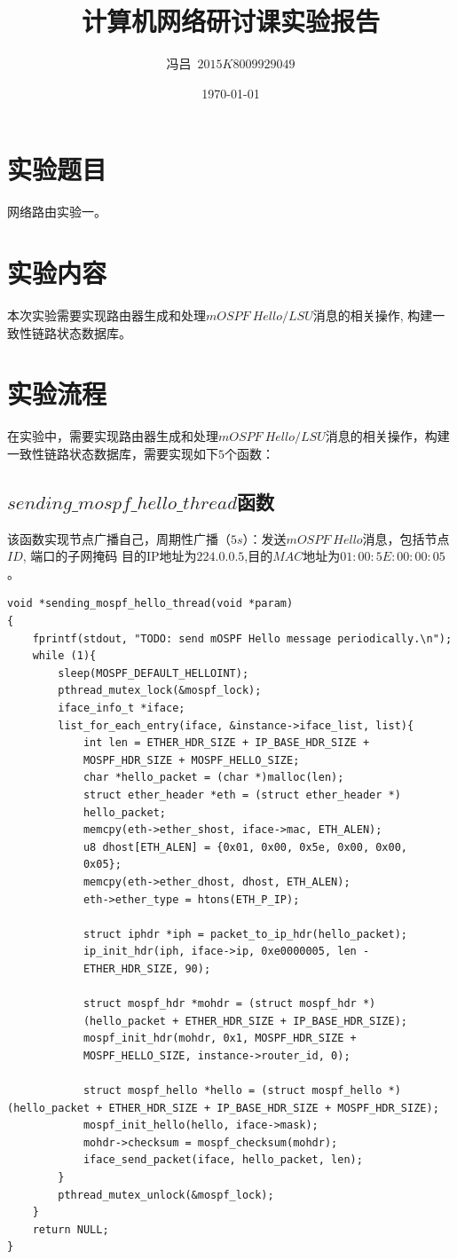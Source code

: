 \documentclass[UTF8,noindent]{ctexart}
\title{\CJKfamily{zhkai}计算机网络研讨课实验报告}
\author{{\CJKfamily{zhkai}冯吕}\ $2015K8009929049$}
\date{\today}
\begin{document}
\maketitle
{}
\section*{{实验题目}}网络路由实验一。
\section*{{实验内容}}
本次实验需要实现路由器生成和处理$mOSPF\ Hello/LSU$消息的相关操作,
构建一致性链路状态数据库。
\section*{{实验流程}}
在实验中，需要实现路由器生成和处理$mOSPF\ Hello/LSU$消息的相关操作，构建一致性链路状态数据库，需要实现如下$5$个函数：
\subsection{$sending\_mospf\_hello\_thread$函数}
该函数实现节点广播自己，周期性广播（$5s$）：发送$mOSPF\ Hello$消息，包括节点$ID$, 端口的子网掩码
目的IP地址为$224.0.0.5$,目的$MAC$地址为$01:00:5E:00:00:05$。
\begin{lstlisting}
void *sending_mospf_hello_thread(void *param)
{
	fprintf(stdout, "TODO: send mOSPF Hello message periodically.\n");
	while (1){
		sleep(MOSPF_DEFAULT_HELLOINT);
		pthread_mutex_lock(&mospf_lock);
		iface_info_t *iface;
		list_for_each_entry(iface, &instance->iface_list, list){
			int len = ETHER_HDR_SIZE + IP_BASE_HDR_SIZE +
			MOSPF_HDR_SIZE + MOSPF_HELLO_SIZE;
			char *hello_packet = (char *)malloc(len);
			struct ether_header *eth = (struct ether_header *)
			hello_packet;
			memcpy(eth->ether_shost, iface->mac, ETH_ALEN);
			u8 dhost[ETH_ALEN] = {0x01, 0x00, 0x5e, 0x00, 0x00, 
			0x05};
			memcpy(eth->ether_dhost, dhost, ETH_ALEN);
			eth->ether_type = htons(ETH_P_IP);

			struct iphdr *iph = packet_to_ip_hdr(hello_packet);
			ip_init_hdr(iph, iface->ip, 0xe0000005, len - 
			ETHER_HDR_SIZE, 90);

			struct mospf_hdr *mohdr = (struct mospf_hdr *)
			(hello_packet + ETHER_HDR_SIZE + IP_BASE_HDR_SIZE);
			mospf_init_hdr(mohdr, 0x1, MOSPF_HDR_SIZE +
			MOSPF_HELLO_SIZE, instance->router_id, 0);

			struct mospf_hello *hello = (struct mospf_hello *)
(hello_packet + ETHER_HDR_SIZE + IP_BASE_HDR_SIZE + MOSPF_HDR_SIZE);
			mospf_init_hello(hello, iface->mask);
			mohdr->checksum = mospf_checksum(mohdr);
			iface_send_packet(iface, hello_packet, len);
		}
		pthread_mutex_unlock(&mospf_lock);
	}
	return NULL;
}
\end{lstlisting}
\end{document}
